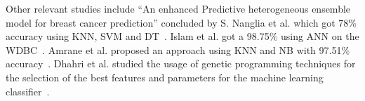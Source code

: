 Other relevant studies include “An enhanced Predictive heterogeneous ensemble model for breast cancer prediction” concluded by S. Nanglia et al. which got 78\% accuracy using KNN, SVM and DT~\cite{carte1}. Islam et al. got a 98.75\% using ANN on the WDBC~\cite{carte3}. Amrane et al. proposed an approach using KNN and NB with 97.51\% accuracy~\cite{carte4}. Dhahri et al. studied the usage of genetic programming techniques for the selection of the best features and parameters for the machine learning classifier~\cite{carte5}.